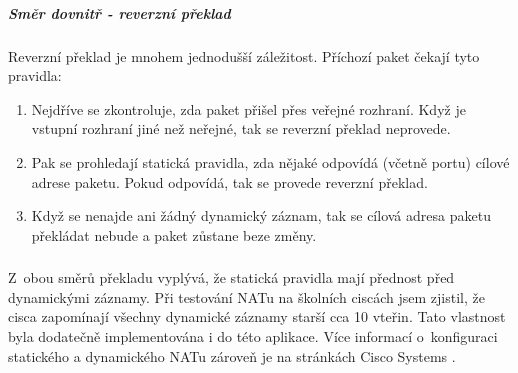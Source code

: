 


\subparagraph{Směr dovnitř - reverzní překlad}

Reverzní překlad je mnohem jednodušší záležitost. Příchozí paket čekají tyto pravidla:
\begin{enumerate}
  \item Nejdříve se zkontroluje, zda paket přišel přes veřejné rozhraní. Když je vstupní rozhraní jiné než neřejné, tak se reverzní překlad neprovede.

  \item Pak se prohledají statická pravidla, zda nějaké odpovídá (včetně portu) cílové adrese paketu. Pokud odpovídá, tak se provede reverzní překlad.

  \item Když se nenajde ani žádný dynamický záznam, tak se cílová adresa paketu překládat nebude a paket zůstane beze změny.
\end{enumerate}


\subsubsection*{}
Z~obou směrů překladu vyplývá, že statická pravidla mají přednost před dynamickými záznamy. Při testování NATu na školních ciscách jsem zjistil, že cisca zapomínají všechny dynamické záznamy starší cca 10 vteřin. Tato vlastnost byla dodatečně implementována i do této aplikace. Více informací o~konfiguraci statického a dynamického NATu zároveň je na stránkách Cisco Systems \cite{cisco:snat_dnat}.









